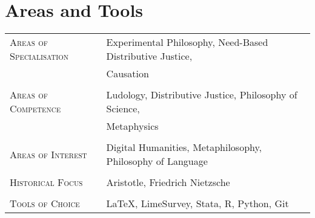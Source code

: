 \documentclass[a4paper,10pt]{article}
\begin{document}
\vspace{0.5cm}
\section{Areas and Tools}
\begin{longtable}{p{4cm}p{11.5cm}}
   \textsc{Areas of Specialisation}   & Experimental Philosophy, Need-Based Distributive Justice,\\
                                      & Causation\\
                                      & \\
   \textsc{Areas of Competence}       & Ludology, Distributive Justice, Philosophy of Science,\\
                                      & Metaphysics\\
                                      & \\
   \textsc{Areas of Interest}         & Digital Humanities, Metaphilosophy, Philosophy of Language\\
                                      & \\
   \textsc{Historical Focus}          & Aristotle, Friedrich Nietzsche\\
                                      & \\
   \textsc{Tools of Choice}           & \LaTeX, LimeSurvey, Stata, R, Python, Git
\end{longtable}


\clearpage
\end{document}
